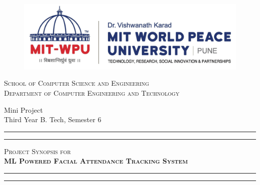 \documentclass[11pt]{article}
\begin{document}
\begin{titlepage}
    \centering


    \begin{figure}[H]
        \centering
        \includegraphics[width=.75\textwidth]{mitwpu.jpg}
    \end{figure}

    \huge\textsc{
        School of Computer Science and Engineering\\
    }
    \vspace{0.75\baselineskip}
    \Large\textsc{
        Department of Computer Engineering and Technology
    }\\
        \vspace{0.75\baselineskip} %

    \LARGE{
        Mini Project\\
        Third Year B. Tech, Semester 6
    }

    \vfill %


    \rule{\textwidth}{1.6pt}\vspace*{-\baselineskip}\vspace*{2pt}
    \rule{\textwidth}{0.6pt}
    \vspace{0.75\baselineskip} %



    \huge{\textsc{
        Project Synopsis for\\
        \textbf{ML Powered Facial Attendance Tracking System}
        }} \\



    \vspace{0.5\baselineskip} %
    \rule{\textwidth}{0.6pt}\vspace*{-\baselineskip}\vspace*{2.8pt}
    \rule{\textwidth}{1.6pt}

    \vspace{1\baselineskip} %


\end{titlepage}
\end{document}
